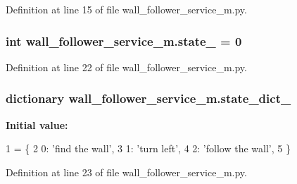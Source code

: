 Definition at line 15 of file wall\+\_\+follower\+\_\+service\+\_\+m.\+py.

\subsubsection[{\texorpdfstring{state\+\_\+}{state_}}]{\setlength{\rightskip}{0pt plus 5cm}int wall\+\_\+follower\+\_\+service\+\_\+m.\+state\+\_\+ = 0}\hypertarget{namespacewall__follower__service__m_abc963136b4d1de74889fcb2c0ab2bf34}{}\label{namespacewall__follower__service__m_abc963136b4d1de74889fcb2c0ab2bf34}


Definition at line 22 of file wall\+\_\+follower\+\_\+service\+\_\+m.\+py.

\subsubsection[{\texorpdfstring{state\+\_\+dict\+\_\+}{state_dict_}}]{\setlength{\rightskip}{0pt plus 5cm}dictionary wall\+\_\+follower\+\_\+service\+\_\+m.\+state\+\_\+dict\+\_\+}\hypertarget{namespacewall__follower__service__m_a6f7fc10e2a6a622e5c561a2b13b87acf}{}\label{namespacewall__follower__service__m_a6f7fc10e2a6a622e5c561a2b13b87acf}
{\bfseries Initial value\+:}
\begin{DoxyCode}
1 = \{
2     0: \textcolor{stringliteral}{'find the wall'},
3     1: \textcolor{stringliteral}{'turn left'},
4     2: \textcolor{stringliteral}{'follow the wall'},
5 \}
\end{DoxyCode}


Definition at line 23 of file wall\+\_\+follower\+\_\+service\+\_\+m.\+py.

